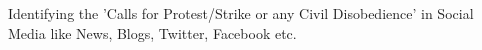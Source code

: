 Identifying the 'Calls for Protest/Strike or any Civil Disobedience' in Social Media like News, Blogs, Twitter, Facebook etc.
